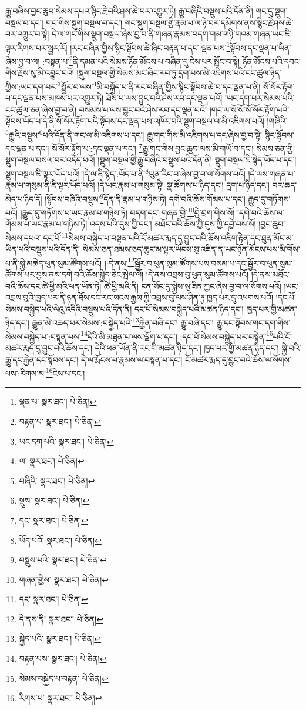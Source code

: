 རྒྱུ་བཞིས་བྱང་ཆུབ་སེམས་དཔའ་སྙིང་རྗེ་བའི་ཤས་ཆེ་བར་འགྱུར་ཏེ། རྒྱུ་བཞིའི་བསྡུས་པའི་དོན་ནི། གང་དུ་སྡུག་བསྔལ་བ་དང་། གང་གིས་སྡུག་བསྔལ་བ་དང་། གང་སྡུག་བསྔལ་གྱི་རྣམ་པ་ལ་ཉེ་བར་དམིགས་ནས་སྙིང་རྗེ་ཤས་ཆེ་བར་འགྱུར་བ་སྟེ། དེ་ལ་གང་གིས་སྡུག་བསྔལ་ཞེས་བྱ་བ་ནི་གཞན་རྣམས་བདག་གམ་གཉི་གའམ་གཞན་ཡང་ཇི་ལྟར་རིགས་པར་སྦྱར་རོ། །རང་བཞིན་གྱིས་སྙིང་སྟོབས་ཆེ་ཞིང་བརྟན་པ་དང་:ལྡན་པས་\footnote{ལྡན་པ་  སྣར་ཐང་།  པེ་ཅིན། }སྟོབས་དང་ལྡན་པ་ཡིན་ཞེས་བྱ་བ་ལ། :བསྟན་པ་\footnote{བརྟན་པ་  སྣར་ཐང་།  པེ་ཅིན། }ནི་དམན་པའི་སེམས་ཉོན་མོངས་པ་བཞིན་དུ་ངེས་པར་སྤོང་བ་སྟེ། ཉོན་མོངས་པའི་དབང་གིས་རྗེས་སུ་མི་འབྱུང་བའོ། །སྡུག་བསྔལ་གྱི་སེམས་མང་ཞིང་རབ་ཏུ་དྲག་པས་མི་འཇིགས་པའི་ངང་ཚུལ་ཉིད་ཀྱིས་:ཡང་དག་པར་\footnote{ཡང་དག་པའི་  སྣར་ཐང་།  པེ་ཅིན། }སྦྱོར་བ་ལས་\footnote{ལ་  སྣར་ཐང་།  པེ་ཅིན། }མི་བསྐྱོད་པ་ནི་རང་བཞིན་གྱིས་སྙིང་སྟོབས་ཆེ་བ་དང་ལྡན་པ་ནི། སོ་སོར་རྟོག་པ་དང་ལྡན་པས་མཁས་པར་འགྱུར་ཏེ། ཐོས་པ་ལས་བྱུང་བའི་ཤེས་རབ་དང་ལྡན་པའོ། །ཡང་དག་པར་སེམས་པའི་ངང་ཚུལ་ཅན་ཞེས་བྱ་བ་ནི། བསམས་པ་ལས་བྱུང་བའི་ཤེས་རབ་དང་ལྡན་པའོ། །གང་ལ་སོ་སོ་སོ་སོར་རྟོག་པའི་སྟོབས་ཡོད་པ་དེ་ནི་སོ་སོར་རྟོག་པའི་སྟོབས་དང་ལྡན་པས་འཁོར་བའི་སྡུག་བསྔལ་ལ་མི་འཇིགས་པའོ། །གཞིའི་\footnote{བཞིའི་  སྣར་ཐང་།  པེ་ཅིན། }རྒྱུའི་བསྡུས་\footnote{སྡུས་  སྣར་ཐང་།  པེ་ཅིན། }པའི་དོན་ནི་གང་ལ་མི་འཇིགས་པ་དང་། རྒྱུ་གང་གིས་མི་འཇིགས་པ་དང་ཞེས་བྱ་བ་སྟེ། སྙིང་སྟོབས་དང་ལྡན་པ་དང་། སོ་སོར་རྟོག་པ་:དང་ལྡན་པ་དང་། \footnote{དང་  སྣར་ཐང་།  པེ་ཅིན། }རྒྱུ་གང་གིས་བྱང་ཆུབ་ལས་མི་གཡོ་བ་དང་། སེམས་ཅན་གྱི་སྡུག་བསྔལ་བསལ་བར་འདོད་པའོ། །སྡུག་བསྔལ་གྱི་རྒྱུ་བཞིའི་བསྡུས་པའི་དོན་ནི། སྡུག་བསྔལ་ཇི་སྙེད་ཡོད་པ་དང་། སྡུག་བསྔལ་ཇི་ལྟར་ཡོད་པའོ། །དེ་ལ་ཇི་སྙེད་:ཡོད་པ་ནི་\footnote{ཡོད་པའོ་  སྣར་ཐང་།  པེ་ཅིན། }ཡུན་རིང་བ་ཞེས་བྱ་བ་ལ་སོགས་པའོ། །དེ་ལས་གཞན་པ་རྣམ་པ་གསུམ་ནི་ཇི་ལྟར་ཡོད་པའོ། །དེ་ཡང་རྣམ་པ་གསུམ་སྟེ། སྣ་ཚོགས་པ་ཉིད་དང་། དྲག་པ་ཉིད་དང་། བར་ཆད་མེད་པ་ཉིད་དོ། །སྟོབས་བཞིའི་བསྡུས་\footnote{བསྡུས་པའི་  སྣར་ཐང་།  པེ་ཅིན། }དོན་ནི་རྣམ་པ་གཉིས་ཏེ། དགེ་བའི་ཆོས་གོམས་པ་དང་། རྒྱུད་དུ་གཏོགས་པའོ། །རྒྱུད་དུ་གཏོགས་པ་ཡང་རྣམ་པ་གཉིས་ཏེ། བདག་དང་:གཞན་གྱི་\footnote{གཞན་གྱིས་  སྣར་ཐང་།  པེ་ཅིན། }བྱེ་བྲག་གིས་སོ། །དགེ་བའི་ཆོས་ལ་གོམས་པ་ཡང་རྣམ་པ་གཉིས་ཏེ། འདས་པའི་དུས་ཀྱི་དང་། མཐོང་བའི་ཆོས་ཀྱི་དུས་ཀྱི་དབྱེ་བས་སོ། །བྱང་ཆུབ་སེམས་དཔའ་:དང་པོ་\footnote{དང་  སྣར་ཐང་།  པེ་ཅིན། }སེམས་བསྐྱེད་པ་བསྟན་པའི་ངོ་མཚར་རྨད་དུ་བྱུང་བའི་ཆོས་འཇིག་རྟེན་དང་ཐུན་མོང་མ་ཡིན་པའི་བསྡུས་པའི་དོན་ནི། སེམས་ཅན་ཐམས་ཅད་ཆུང་མ་ལྟར་ཡོངས་སུ་འཛིན་ན་ཡང་ཉོན་མོངས་པས་མི་གོས་པ་ནི་སྐྱེ་མཆེད་ཕུན་སུམ་ཚོགས་པའོ། །:དེ་ནས་\footnote{དེ་ནས་ནི་  སྣར་ཐང་།  པེ་ཅིན། }སྦྱོར་བ་ཕུན་སུམ་ཚོགས་པས་བསམ་པ་དང་སྦྱོར་བ་ཕུན་སུམ་ཚོགས་པར་བྱས་ནས་དགེ་བའི་ཆོས་སྐྱེད་ཅིང་སྤེལ་ལོ། །དེ་ནས་འབྲས་བུ་ཕུན་སུམ་ཚོགས་པའོ། །དེ་ནས་མཐོང་བའི་ཆོས་དང་ཚེ་ཕྱི་མའི་ཕན་ཡོན་ཏེ། ཚེ་ཕྱི་མའི་ནི། ངན་སོང་དུ་སྐྱེས་སུ་ཟིན་ཀྱང་ཞེས་བྱ་བ་ལ་སོགས་པའོ། །ཡང་འབྲས་བུའི་ཁྱད་པར་ནི་ཉན་ཐོས་དང་རང་སངས་རྒྱས་ཀྱི་འབྲས་བུ་ལས་ཤིན་ཏུ་ཁྱད་པར་དུ་འཕགས་པའོ། །དང་པོ་སེམས་བསྐྱེད་པའི་ལེའུ་འདིའི་བསྡུས་པའི་དོན་ནི། དང་པོ་སེམས་བསྐྱེད་པའི་མཚན་ཉིད་དང་། ཁྱད་པར་གྱི་མཚན་ཉིད་དང་། རྒྱུན་མི་འཆད་པར་སེམས་:བསྐྱེད་པའི་\footnote{སྐྱེད་པའི་  སྣར་ཐང་།  པེ་ཅིན། }རྐྱེན་བཞི་དང་། རྒྱུ་བཞི་དང་། རྒྱུ་དང་སྟོབས་གང་དག་གིས་སེམས་བསྐྱེད་པ་:བསྟན་པས་\footnote{བརྟན་པས་  སྣར་ཐང་།  པེ་ཅིན། }དེའི་མི་མཐུན་པ་ལས་ལྡོག་པ་དང་། :དང་པོ་སེམས་བསྐྱེད་པར་བསྟེན་\footnote{སེམས་བསྐྱེད་པ་བརྟན་  པེ་ཅིན། }པའི་ངོ་མཚར་རྨད་དུ་བྱུང་བའི་ཆོས་དང་། དེའི་ཕན་ཡོན་ནི་རང་གི་མཚན་ཉིད་དང་། ཁྱད་པར་གྱི་མཚན་ཉིད་དང་། སྐྱེ་བའི་རྒྱུ་དང་རྐྱེན་དང་སྟོབས་དང་། དེ་ལ་རྨོངས་པ་རྣམས་ལ་བསྟན་པ་དང་། ངོ་མཚར་རྨད་དུ་བྱུང་བའི་ཆོས་ལ་སོགས་པས་:རིགས་མ་\footnote{རིགས་པ་  སྣར་ཐང་།  པེ་ཅིན། }ངེས་པ་དང་། 